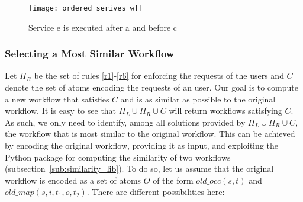 \documentclass{new_tlp}
\begin{document}
%
\begin{figure*}[h]
		\centerline{\texttt{[image: ordered\_serives\_wf]}}
	\caption{Service e is executed after a and before c}
	\label{ordered_serives_wf}
\end{figure*}
%
%
\subsubsection{Selecting a Most Similar Workflow}

Let $\Pi_R$ be the set of rules \eqref{r1}-\eqref{r6} for enforcing the requests of the users and $C$ denote the set of atoms encoding the requests of an user. Our goal is to compute a new workflow that satisfies $C$ and is as  similar as possible to the original workflow. It is easy to see that $\Pi_L \cup \Pi_R \cup C$ will return workflows satisfying $C$. As such, we only need to identify, among all solutions provided by $\Pi_L \cup \Pi_R \cup C$, the workflow that is most similar to the original workflow. This can be achieved by encoding the original workflow, providing it as input, and exploiting the Python package for computing the similarity of two workflows (subsection~\ref{sub:similarity_lib}). 
To do so, let us assume that the original workflow is encoded  as a set of atoms $O$ of the form $old\_occ(s,t)$ and 
$old\_map(s, i, t_1, o, t_2)$. There are different possibilities here: 
\end{document}
